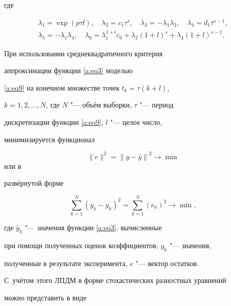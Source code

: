 где

\begin{equation}\label{f2_2_11}

\begin{array}{c}

\lambda_1= \exp (p \tau l),\quad 

\lambda_2= c_1 \tau ^ s,\quad 

\lambda_3= -\lambda_1 \lambda_2,\quad 

\lambda_4= d_1 \tau ^ {s - 1},\\

\lambda_5= -\lambda_1 \lambda_4,\quad 

\lambda_6=\lambda_1 ^{1+l} c_0 + \lambda_2 (1+l)^s+ \lambda_4 (1+l)^{s-1}.

\end{array}

\end{equation}



При использовании сред\-не\-квад\-ра\-тич\-но\-го критерия

ап\-прок\-си\-ма\-ции \cite{v:Z} функции \eqref{a:eq3} моделью

\eqref{a:eq9}  на конечном множестве точек  $t_k=\tau(k+l)$,

$k=1, 2, \ldots, N $, где $N$ "--- объём выборки, $\tau$ "--- период

дискретизации функции \eqref{a:eq9}, $l$ "--- целое число,

минимизируется функ\-цио\-нал 

$$ \|e\|

^{2}=\left\|y-\hat{y}\right\| ^{2}\rightarrow \min $$ или в

развёрнутой форме

$$

\sum\limits_{k=1}^{N}(y_k-\hat{y}_k)^2=

\sum\limits_{k=1}^{N}(e_k)^2 \rightarrow \min ,

$$

где $\hat{y}_k$ "--- значения функции \eqref{a:eq3}, вычисленные

при помощи полученных оценок коэффициентов, $y_k$ "--- значения,

полученные в результате эксперимента, $e$ "--- вектор остатков. 

С~учётом этого ЛПДМ в форме стохастических разностных урав\-не\-ний

можно пред\-ста\-вить в виде

